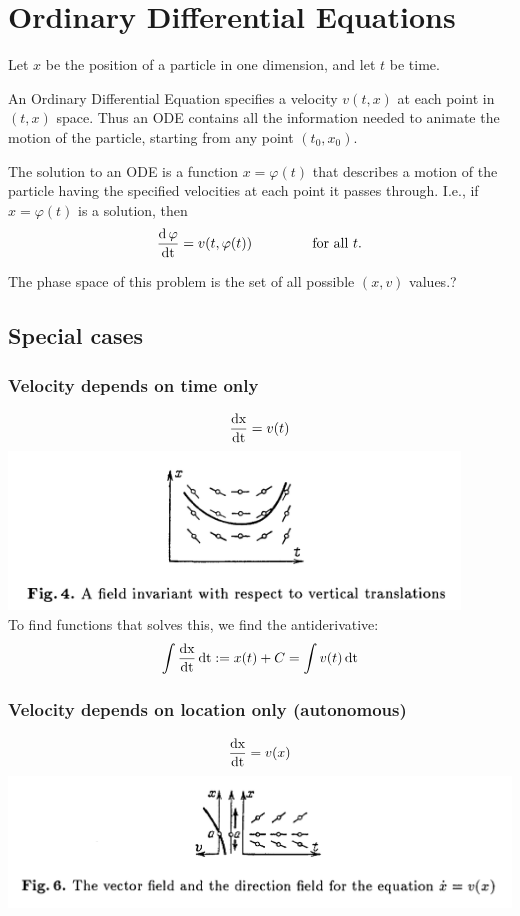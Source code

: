 \section{Ordinary Differential Equations}

Let $x$ be the position of a particle in one dimension, and let $t$ be time.

An Ordinary Differential Equation specifies a velocity $v(t, x)$ at each point
in $(t, x)$ space. Thus an ODE contains all the information needed to animate
the motion of the particle, starting from any point $(t_0, x_0)$.

The solution to an ODE is a function $x = \varphi(t)$ that describes a motion
of the particle having the specified velocities at each point it passes
through. I.e., if $x = \varphi(t)$ is a solution, then
\begin{align*}
  \frac{\operatorname{\text{d}} \varphi}{\operatorname{\text{dt}}} = v(t, \varphi(t)) ~~~~~~~~~~~~~\text{for all $t$}.
\end{align*}

The phase space of this problem is the set of all possible $(x, v)$ values.?

\subsection{Special cases}
\subsubsection{Velocity depends on time only}
\begin{align*}
  \frac{\operatorname{\text{dx}}}{\operatorname{\text{dt}}} = v(t)
\end{align*}
\includegraphics[width=340pt]{img/differential-equations-1-direction-field.png}\\
To find functions that solves this, we find the antiderivative:
\begin{align*}
  \int \frac{\operatorname{\text{dx}}}{\operatorname{\text{dt}}} \operatorname{\text{dt}} := x(t) + C = \int v(t) \operatorname{\text{dt}}
\end{align*}

\subsubsection{Velocity depends on location only (autonomous)}
\begin{align*}
  \frac{\operatorname{\text{dx}}}{\operatorname{\text{dt}}} = v(x)
\end{align*}
\includegraphics[width=400pt]{img/differential-equations-2-direction-field.png}\\


